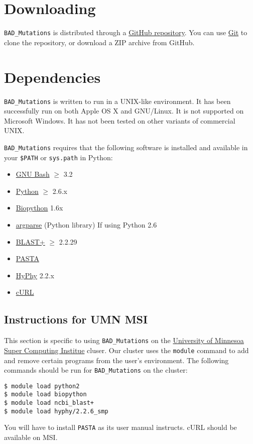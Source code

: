 \documentclass[12pt]{article}
\newcommand{\BM}{\texttt{BAD\_Mutations} }
\begin{document}
\section*{Downloading}
\par \BM is distributed through a
\href{https://github.com/MorrellLAB/BAD_Mutations}{GitHub repository}. You can
use \href{https://git-scm.com/}{Git} to clone the repository, or download a ZIP
archive from GitHub.

\section*{Dependencies}
\par \BM is written to run in a UNIX-like environment. It has been successfully
run on both Apple OS X and GNU/Linux. It is not supported on Microsoft Windows.
It has not been tested on other variants of commercial UNIX.

\par \BM requires that the following software is installed and
available in your \texttt{\$PATH} or \texttt{sys.path} in Python:
\begin{itemize}[noitemsep]
    \item \href{https://www.gnu.org/software/bash/}{GNU Bash} $\geq$ 3.2
    \item \href{https://www.python.org/}{Python} $\geq$ 2.6.x
    \item \href{http://biopython.org/}{Biopython} 1.6x
    \item \href{https://code.google.com/p/argparse/}{argparse} (Python library) If using Python 2.6
    \item \href{https://blast.ncbi.nlm.nih.gov/Blast.cgi?PAGE_TYPE=BlastDocs&DOC_TYPE=Download}{BLAST+} $\geq$ 2.2.29
    \item \href{http://www.cs.utexas.edu/~phylo/software/pasta/}{PASTA}
    \item \href{http://hyphy.org/}{HyPhy} 2.2.x
    \item \href{http://curl.haxx.se/}{cURL}
\end{itemize}

\subsection*{Instructions for UMN MSI}
\par This section is specific to using \BM on the \href{http://msi.umn.edu/}
{University of Minnesoa Super Computing Institue} cluser. Our cluster uses the
\texttt{module} command to add and remove certain programs from the user's
environment. The following commands should be run for \BM on the cluster:
\begin{Verbatim}[frame=single, fontsize=\small, rulecolor=\color{gray}]
$ module load python2
$ module load biopython
$ module load ncbi_blast+
$ module load hyphy/2.2.6_smp
\end{Verbatim}
\par You will have to install \texttt{PASTA} as its user manual instructs. cURL
should be available on MSI.
\end{document}

